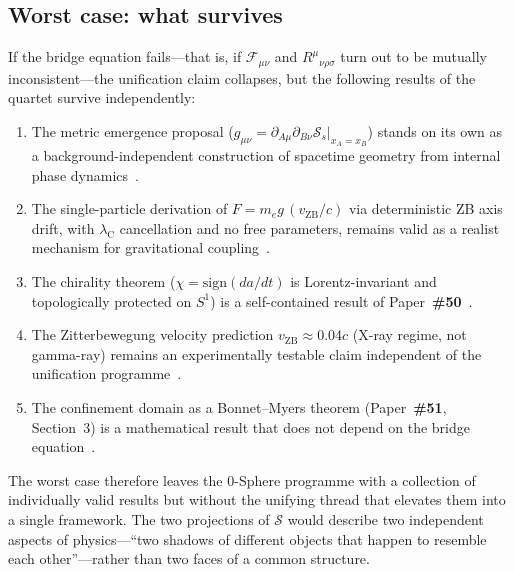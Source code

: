 \documentclass[12pt,letterpaper]{article}
\newcommand{\paperno}[1]{\textbf{\#{}#1}}
\newcommand{\vZB}{v_{\mathrm{ZB}}}
\newcommand{\lambdaC}{\lambda_{\mathrm{C}}}
\newcommand{\calS}{\mathcal{S}}
\begin{document}
\subsection{Worst case: what survives}
\label{subsec:worst_case}

If the bridge equation fails---that is, if $\mathcal{F}_{\mu\nu}$ and
$R^\mu{}_{\nu\rho\sigma}$ turn out to be mutually inconsistent---the
unification claim collapses, but the following results of the quartet
survive independently:

\begin{enumerate}[label=(\roman*), leftmargin=2em]
\item The metric emergence proposal
      ($g_{\mu\nu} = \partial_{A\mu}\partial_{B\nu}\calS_s\big|_{x_A=x_B}$)
      stands on its own as a background-independent construction of spacetime
      geometry from internal phase dynamics~\cite{hanamura51}.
\item The single-particle derivation of $F = m_e g\,(\vZB/c)$ via deterministic
      ZB axis drift, with $\lambdaC$ cancellation and no free parameters, remains valid as a
      realist mechanism for gravitational coupling~\cite{hanamura52}.
\item The chirality theorem ($\chi = \mathrm{sign}(da/dt)$ is Lorentz-invariant
      and topologically protected on $S^1$) is a self-contained result
      of Paper~\paperno{50}~\cite{hanamura50}.
\item The Zitterbewegung velocity prediction
      $\vZB\approx 0.04c$ (X-ray regime, not gamma-ray)
      remains an experimentally testable claim independent of the
      unification programme~\cite{hanamura10}.
\item The confinement domain as a Bonnet--Myers theorem
      (Paper~\paperno{51}, Section~3) is a mathematical result that does not
      depend on the bridge equation~\cite{hanamura51}.
\end{enumerate}
The worst case therefore leaves the 0-Sphere programme with a collection
of individually valid results but without the unifying thread that
elevates them into a single framework.
The two projections of $\calS$ would describe two independent aspects
of physics---``two shadows of different objects that happen to resemble
each other''---rather than two faces of a common structure.

\clearpage

\end{document}
